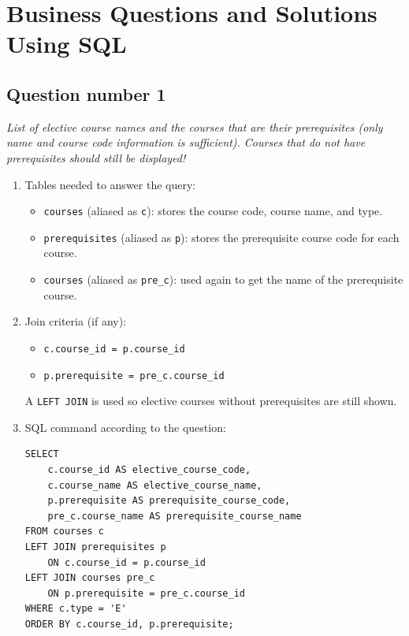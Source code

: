 \section{Business Questions and Solutions Using SQL}

\subsection{Question number 1}

\begin{tcolorbox}
  \textit{List of elective course names and the courses that are their prerequisites (only name and course code information is sufficient). Courses that do not have prerequisites should still be displayed!}
\end{tcolorbox}

\begin{enumerate}
    \itemsep0em
    \item Tables needed to answer the query:
    \begin{itemize}
        \item \texttt{courses} (aliased as \texttt{c}): stores the course code, course name, and type.
        \item \texttt{prerequisites} (aliased as \texttt{p}): stores the prerequisite course code for each course.
        \item \texttt{courses} (aliased as \texttt{pre\_c}): used again to get the name of the prerequisite course.
    \end{itemize}

    \item Join criteria (if any):
    \begin{itemize}
        \item \texttt{c.course\_id = p.course\_id}
        \item \texttt{p.prerequisite = pre\_c.course\_id}
    \end{itemize}
    A \texttt{LEFT JOIN} is used so elective courses without prerequisites are still shown.

    \item SQL command according to the question:
    \begin{lstlisting}
SELECT
    c.course_id AS elective_course_code,
    c.course_name AS elective_course_name,
    p.prerequisite AS prerequisite_course_code,
    pre_c.course_name AS prerequisite_course_name
FROM courses c
LEFT JOIN prerequisites p
    ON c.course_id = p.course_id
LEFT JOIN courses pre_c
    ON p.prerequisite = pre_c.course_id
WHERE c.type = 'E'
ORDER BY c.course_id, p.prerequisite;
    \end{lstlisting}


\end{enumerate}
